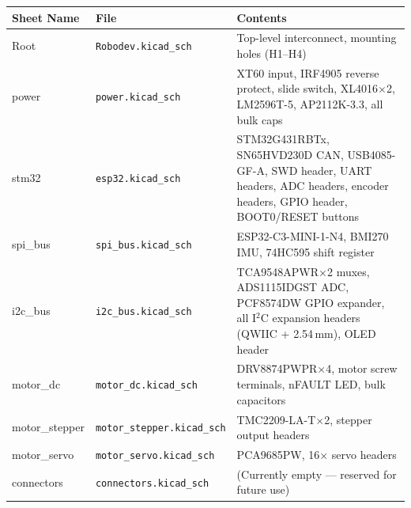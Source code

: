\documentclass[11pt,a4paper]{article}
\begin{document}
\begin{longtable}{p{3.5cm} p{4.5cm} p{7cm}}
  \toprule
  \rowcolor{headergray}\color{white}\textbf{Sheet Name} &
  \color{white}\textbf{File} &
  \color{white}\textbf{Contents} \\
  \midrule\endhead
  Root         & \texttt{Robodev.kicad\_sch}   & Top-level interconnect, mounting holes (H1--H4) \\
  power        & \texttt{power.kicad\_sch}      & XT60 input, IRF4905 reverse protect, slide switch, XL4016$\times$2, LM2596T-5, AP2112K-3.3, all bulk caps \\
  stm32        & \texttt{esp32.kicad\_sch}      & STM32G431RBTx, SN65HVD230D CAN, USB4085-GF-A, SWD header, UART headers, ADC headers, encoder headers, GPIO header, BOOT0/RESET buttons \\
  spi\_bus     & \texttt{spi\_bus.kicad\_sch}   & ESP32-C3-MINI-1-N4, BMI270 IMU, 74HC595 shift register \\
  i2c\_bus     & \texttt{i2c\_bus.kicad\_sch}   & TCA9548APWR$\times$2 muxes, ADS1115IDGST ADC, PCF8574DW GPIO expander, all I$^2$C expansion headers (QWIIC + 2.54\,mm), OLED header \\
  motor\_dc    & \texttt{motor\_dc.kicad\_sch}  & DRV8874PWPR$\times$4, motor screw terminals, nFAULT LED, bulk capacitors \\
  motor\_stepper & \texttt{motor\_stepper.kicad\_sch} & TMC2209-LA-T$\times$2, stepper output headers \\
  motor\_servo & \texttt{motor\_servo.kicad\_sch} & PCA9685PW, 16$\times$ servo headers \\
  connectors   & \texttt{connectors.kicad\_sch} & (Currently empty --- reserved for future use) \\
  \bottomrule
\end{longtable}
\end{document}
